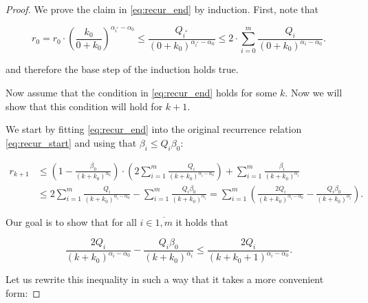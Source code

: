     \begin{proof}
        We prove the claim in \eqref{eq:recur_end} by induction. First, note that

        \begin{equation*}
            r_0 = r_0 \cdot \left(\frac{k_0}{0 + k_0}\right)^{\alpha_{i^*} - \alpha_0} 
            \leq 
            \frac{Q_{i^*}}{(0 + k_0)^{\alpha_{i^*} - \alpha_0}}
            \leq
            2 \cdot \sum\limits_{i = 0}^m \frac{Q_i}{(0 + k_0)^{\alpha_i - \alpha_0}}.
        \end{equation*}
        
        and therefore the base step of the induction holds true. 
        
        Now assume that the condition in \eqref{eq:recur_end} holds for some $k$. Now we will show that this condition will hold for $k + 1$.

        We start by fitting \eqref{eq:recur_end} into the original recurrence relation \eqref{eq:recur_start} and using that $\beta_i \leq Q_i \beta_0$:

        \begin{equation*}
        \begin{split}
            r_{k+1} &\leq
            \left(1 - \frac{\beta_0}{(k + k_0)^{\alpha_0}}\right) \cdot \left(2 \sum\limits_{i = 1}^m \frac{Q_i}{(k + k_0)^{\alpha_i - \alpha_0}} \right) + \sum\limits_{i=1}^m \frac{\beta_i}{(k + k_0)^{\alpha_i}}
            \\&\leq
            2 \sum\limits_{i = 1}^m \frac{Q_i}{(k + k_0)^{\alpha_i - \alpha_0}}
            -
            \sum\limits_{i = 1}^m \frac{Q_i \beta_0}{(k + k_0)^{\alpha_i}}
            =
            \sum\limits_{i = 1}^m \left(\frac{2 Q_i}{(k + k_0)^{\alpha_i - \alpha_0}} - \frac{Q_i \beta_0}{(k + k_0)^{\alpha_i}} \right).
        \end{split}
        \end{equation*}

        Our goal is to show that for all $i \in \overline{1, m}$ it holds that 

        \begin{equation}
        \label{eq:desired_ineq}
            \frac{2 Q_i}{(k + k_0)^{\alpha_i - \alpha_0}} - \frac{Q_i \beta_0}{(k + k_0)^{\alpha_i}} \leq \frac{2 Q_i}{(k + k_0 + 1)^{\alpha_i - \alpha_0}}.
        \end{equation}

        Let us rewrite this inequality in such a way that it takes a more convenient form:


\end{proof}
